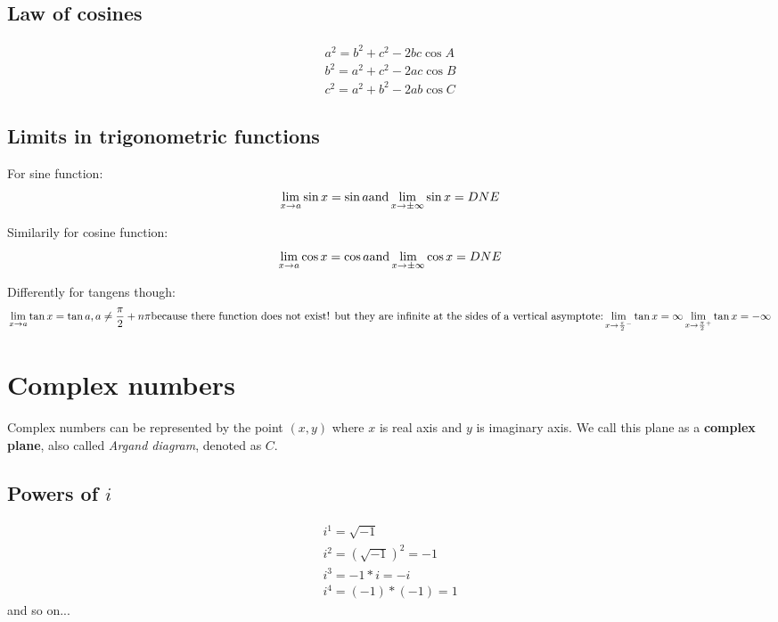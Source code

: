 \documentclass{article}
\begin{document}
\subsection{Law of cosines}
\begin{equation}
  \begin{gathered}
    a^2 = b^2 + c^2 - 2bc\cos{A} \\
    b^2 = a^2 + c^2 - 2ac\cos{B} \\
    c^2 = a^2 + b^2 - 2ab\cos{C}
  \end{gathered}
\end{equation}

\subsection{Limits in trigonometric functions}
For sine function:
\begin{equation}
  \lim\limits_{x \to a}\sin x = \sin a \\
  \text{and}
  \lim\limits_{x \to \pm\infty}\sin x = DNE
\end{equation}

Similarily for cosine function:
\begin{equation}
  \lim\limits_{x \to a}\cos x = \cos a \\
  \text{and}
  \lim\limits_{x \to \pm\infty}\cos x = DNE
\end{equation}

Differently for tangens though:
\begin{equation}
  \lim\limits_{x \to a}\tan x = \tan a, a \neq \frac{\pi}{2} + n\pi \\
  \text{because there function does not exist! but they are infinite at the sides of a vertical asymptote:} \\
  \lim\limits_{x \to \frac{\pi}{2}^-}\tan x = \infty \\
  \lim\limits_{x \to \frac{\pi}{2}^+}\tan x = -\infty
\end{equation}

\section{Complex numbers}
Complex numbers can be represented by the point $(x, y)$ where $x$ is real axis and $y$
is imaginary axis. We call this plane as a \textbf{complex plane}, also called
\textit{Argand diagram}, denoted as $C$.

\subsection{Powers of $i$}
\begin{equation}
  \begin{gathered}
    i^1 = \sqrt{-1} \\
    i^2 = (\sqrt{-1})^2 = -1 \\
    i^3 = -1 * i = -i \\
    i^4 = (-1) * (-1) = 1
  \end{gathered}
\end{equation}
and so on...
\end{document}
